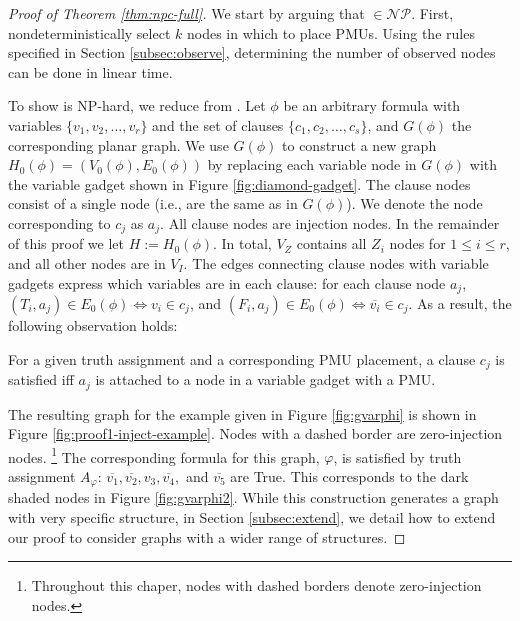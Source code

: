 \begin{proof}[Proof of Theorem \ref{thm:npc-full}]
We start by arguing that \full $\in \mathcal{NP}$. First, nondeterministically select $k$ nodes in which to place PMUs. Using the rules specified in Section \ref{subsec:observe}, determining
the number of observed nodes can be done in linear time.

To show \full is NP-hard, we reduce from \sats.  Let $\phi$ be an arbitrary \sat formula with variables 
$\{v_1,v_2, \dots , v_r\}$ and the set of clauses $\{c_1,c_2,\dots , c_s \}$, and $G(\phi)$ the corresponding planar graph. We use $G(\phi)$ to construct a new graph $H_0(\phi) = (V_0(\phi), E_0(\phi))$ by replacing each variable
node in $G(\phi)$ with the variable gadget shown in Figure \ref{fig:diamond-gadget}. The clause nodes consist of a single node (i.e., are the same
as in $G(\phi)$). We denote the node corresponding to $c_j$ as $a_j$. All clause nodes are injection nodes.  In the remainder of this proof we let $H := H_0(\phi)$.
In total, $V_Z$ contains all $Z_i$ nodes for $1 \leq i \leq r$, and all other nodes are in $V_I$.  The edges connecting clause nodes with variable gadgets express which variables are in each clause: for each clause node $a_j$, $(T_i, a_j)\in E_0(\phi) \Leftrightarrow v_i\in c_j$, and $(F_i, a_j)\in E_0(\phi) \Leftrightarrow \overline{v_i}\in c_j$. As a result, the following observation holds:

\begin{observation}\label{obs:1}
For a given truth assignment and a corresponding PMU placement, a clause $c_j$ is satisfied iff $a_j$ is attached to a node in a variable gadget with a PMU. 
\end{observation}


The resulting graph for the example given in Figure \ref{fig:gvarphi} is shown in Figure \ref{fig:proof1-inject-example}.  Nodes with a dashed border are zero-injection nodes. 
{\footnote {\small  Throughout this chaper, nodes with dashed borders denote zero-injection nodes. }} 
The corresponding formula for this graph, $\varphi$,
is satisfied by truth assignment $A_{\varphi}$: $\overline{v_1}, \overline{v_2}, v_3, \overline{v_4},$ and $\overline{v_5}$ are True. This corresponds to the dark shaded nodes in Figure
\ref{fig:gvarphi2}. While this construction generates a graph with very specific structure, in Section \ref{subsec:extend}, we detail how to extend our proof to consider graphs with a wider range of structures.%



\end{proof}

